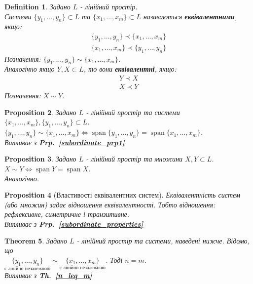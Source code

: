 \documentclass[a4paper, 10pt]{article}
\theoremstyle{theoremdd}
\newtheorem{theorem}{Theorem}[subsection]
\newtheorem{definition}[theorem]{Definition}
\newtheorem{proposition}[theorem]{Proposition}
\newcommand\thref[1]{\textbf{Th.~\ref{#1}}}
\newcommand\prpref[1]{\textbf{Prp.~\ref{#1}}}
\DeclareMathOperator{\linspan}{span}
\begin{document}
	\begin{definition}
	Задано $L$ - лінійний простір.\\
	Системи $\{y_1, \dots, y_n \} \subset L$ та $\{x_1, \dots, x_m \} \subset L$ називаються \textbf{еквівалентними}, якщо:
	\begin{align*}
	\{y_1, \dots, y_n \} \prec \{x_1, \dots, x_m \} \\
	\{x_1, \dots, x_m \} \prec \{y_1, \dots, y_n \}
	\end{align*}
	Позначення: $\{y_1, \dots, y_n \} \sim \{x_1, \dots, x_m \}$.\\
	Аналогічно якщо $Y,X \subset L$, то вони \textbf{еквівалентні}, якщо:
	\begin{align*}
	Y \prec X \\
	X \prec Y
	\end{align*}
	Позначення: $X \sim Y$.
	\end{definition}
	
	\begin{proposition}
	Задано $L$ - лінійний простір та системи $\{x_1,\dots,x_m\}, \{y_1,\dots,y_n\} \subset L$.\\
	$\{y_1, \dots, y_n \} \sim \{x_1, \dots, x_m \} \iff \linspan \{y_1, \dots, y_n\} = \linspan \{x_1, \dots, x_m \}$.\\
	\textit{Випливає з} \prpref{subordinate_prp1}
	\end{proposition}
	
	\begin{proposition}
	Задано $L$ - лінійний простір та множини $X,Y \subset L$.\\
	$X \sim Y \iff \linspan Y = \linspan X$.\\
	\textit{Аналогічно.}
	\end{proposition}
	
	\begin{proposition}[Властивості еквівалентних систем]
	Еквівалентність систем (або множин) задає відношення еквівалентності. Тобто відношення: рефлексивне, симетричне і транзитивне.\\
	\textit{Випливає з} \prpref{subordinate_properties}
	\end{proposition}
	
	\begin{theorem}
	\label{n_eq_m}
	Задано $L$ - лінійний простір та системи, наведені нижче. Відомо, що \\ $\underset{\textrm{є лінійно незалежною}}{\{y_1, \dots, y_n \}} \sim \underset{\textrm{є лінійно незалежною}}{\{x_1, \dots, x_m \}} $. Тоді $n = m$.\\
	\textit{Випливає з} \thref{n_leq_m}
	\end{theorem}
	
\end{document}
